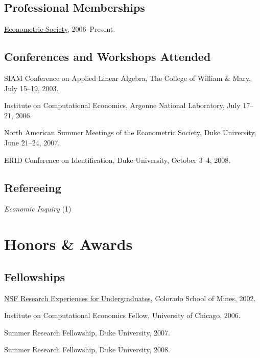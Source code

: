 \documentclass[letterpaper]{article}
\renewenvironment{itemize}{
  \begin{list}{}{
    \setlength{\leftmargin}{1em}
  }
}{
  \end{list}
}
\begin{document}
\subsection*{Professional Memberships}

\begin{itemize}
\item \href{http://www.econometricsociety.org/}{Econometric Society},
  2006--Present.
\end{itemize}

\subsection*{Conferences and Workshops Attended}

\begin{itemize}
\item SIAM Conference on Applied Linear Algebra,
  The College of William \& Mary,
  July 15--19, 2003.
\item Institute on Computational Economics,
  Argonne National Laboratory,
  July 17--21, 2006.
\item North American Summer Meetings of the Econometric Society,
  Duke University,
  June 21--24, 2007.
\item ERID Conference on Identification,
  Duke University,
  October 3--4, 2008.
\end{itemize}

\subsection*{Refereeing}

\begin{itemize}
\item \textit{Economic Inquiry} (1)
\end{itemize}


\section*{Honors \& Awards}

\subsection*{Fellowships}

\begin{itemize}
\item \href{http://www.nsf.gov/crssprgm/reu/}{NSF Research Experiences
    for Undergraduates}, Colorado School of Mines, 2002.
\item Institute on Computational Economics Fellow, University of Chicago, 2006.
\item Summer Research Fellowship, Duke University, 2007.
\item Summer Research Fellowship, Duke University, 2008.
\end{itemize}
\end{document}
